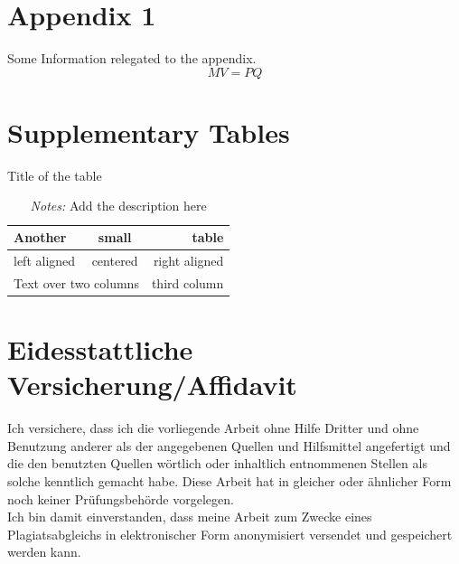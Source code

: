 \documentclass[a4paper,12pt]{scrartcl} %
\begin{document}
\clearpage
\appendix
{} %

\section{Appendix 1}

Some Information relegated to the appendix.
\begin{equation}
    MV=PQ
\end{equation}

\pagebreak

\section{Supplementary Tables}




\begin{table}[h!] %
\caption{Title of the table}
\label{tab:SuppTable1}
\centering
 \begin{tabular}{lcr}
   Another & small & table\\
\toprule
   left aligned & centered & right aligned \\
   \multicolumn{2}{c}{Text over two columns} & third column \\
\bottomrule
\end{tabular}
\caption*{\footnotesize{\emph{Notes:} Add the description here}}
\end{table}

\clearpage

\section{Eidesstattliche Versicherung/Affidavit}

Ich versichere, dass ich die vorliegende Arbeit ohne Hilfe Dritter und ohne Benutzung anderer
als der angegebenen Quellen und Hilfsmittel angefertigt und die den benutzten Quellen
wörtlich oder inhaltlich entnommenen Stellen als solche kenntlich gemacht habe. Diese Arbeit
hat in gleicher oder ähnlicher Form noch keiner Prüfungsbehörde vorgelegen.\\
Ich bin damit einverstanden, dass meine Arbeit zum Zwecke eines Plagiatsabgleichs in
elektronischer Form anonymisiert versendet und gespeichert werden kann.\\
\end{document}
